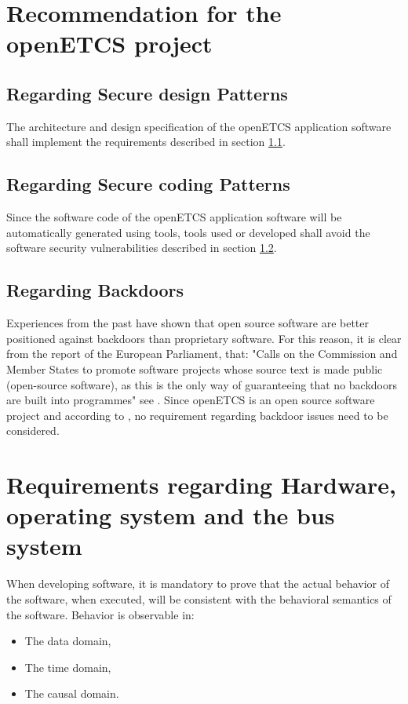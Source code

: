 \documentclass{template/openetcs_report}
\begin{document}
\section{Recommendation for the openETCS project}

\subsection{Regarding Secure design Patterns}
\label{DPatterns}
The architecture and design specification of the openETCS application software shall implement the requirements described in section \ref{DPatterns}.

\subsection{Regarding Secure coding Patterns}
\label{CPatterns}
Since the software code of the openETCS application software will be automatically generated using tools,  tools used or developed shall avoid the software security vulnerabilities described in section \ref{CPatterns}.

\subsection{Regarding Backdoors}
\label{Backdoor}
Experiences from the past have shown that open source software are better positioned against backdoors than proprietary software. For this reason, it is clear from the report of the European Parliament, that: "Calls on the Commission and Member States to promote software projects whose source text is made public (open-source software), as this is the only way of guaranteeing that no backdoors are built into programmes" see \cite{EUParl}.
Since openETCS is an open source software project and according to \cite{EUParl}, no requirement regarding backdoor issues need to be considered.


\section{Requirements regarding Hardware, operating system and the bus system}
When developing software, it is mandatory to prove that the actual behavior of the software, when executed, will be consistent with the behavioral semantics of the software. 
Behavior is observable in: 
\begin{itemize}\itemsep=0pt
  \item The data domain,
  \item The time domain,
  \item The causal domain.
\end{itemize}
\end{document}
